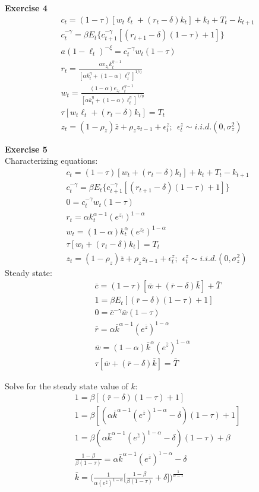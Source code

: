 \documentclass[letterpaper,12pt]{article}
\theoremstyle{definition}
\begin{document}
\textbf{Exercise 4}
\begin{align*}
  &c_t = (1-\tau) [w_t\ell_t+(r_t-\delta)k_t]+k_t+T_t-k_{t+1}
  \\
  &c_t^{-\gamma} = \beta E_t\{c_{t+1}^{-\gamma}[(r_{t+1}-\delta)(1-\tau)+1]\}
  \\
  &a(1-\ell_t)^{-\xi} = c_t^{-\gamma}w_t(1-\tau)
  \\
  &r_t = \frac{\alpha e_{z_t} k_t^{\eta-1}}{[\alpha k_t^\eta+(1-\alpha)\ell_t^\eta]^{1/\eta}}
  \\
  &w_t = \frac{(1-\alpha) e_{z_t} \ell_t^{\eta-1}}{[\alpha k_t^\eta+(1-\alpha)\ell_t^\eta]^{1/\eta}}
  \\
  &\tau[w_t\ell_t+(r_t-\delta)k_t] = T_t
  \\
  &z_t = (1-\rho_z)\bar{z}+\rho_zz_{t-1}+\epsilon_t^z; \ \ \epsilon_t^z \sim i.i.d.(0, \sigma_z^2)
\end{align*}

\textbf{Exercise 5} \\
Characterizing equations:
\begin{align*}
  &c_t = (1-\tau) [w_t+(r_t-\delta)k_t]+k_t+T_t-k_{t+1}
  \\
  &c_t^{-\gamma} = \beta E_t\{c_{t+1}^{-\gamma}[(r_{t+1}-\delta)(1-\tau)+1]\}
  \\
  &0 = c_t^{-\gamma}w_t(1-\tau)
  \\
  &r_t = \alpha k_t^{\alpha-1} (e^{z_t})^{1-\alpha}
  \\
  &w_t = (1-\alpha)k_t^{\alpha}(e^{z_t})^{1-\alpha}
  \\
  &\tau[w_t+(r_t-\delta)k_t] = T_t
  \\
  &z_t = (1-\rho_z)\bar{z}+\rho_zz_{t-1}+\epsilon_t^z; \ \ \epsilon_t^z \sim i.i.d.(0, \sigma_z^2)
\end{align*}
Steady state:
\begin{align*}
  &\bar{c} = (1-\tau) [\bar{w}+(\bar{r}-\delta)\bar{k}]+\bar{T}
  \\
  &1 = \beta E_t[(\bar{r}-\delta)(1-\tau)+1]
  \\
  &0 = \bar{c}^{-\gamma}\bar{w}(1-\tau)
  \\
  &\bar{r} = \alpha \bar{k}^{\alpha-1} (e^{\bar{z}})^{1-\alpha}
  \\
  &\bar{w} = (1-\alpha)\bar{k}^{\alpha}(e^{\bar{z}})^{1-\alpha}
  \\
  &\tau[\bar{w}+(\bar{r}-\delta)\bar{k}] = \bar{T}
\end{align*}

Solve for the steady state value of $k$:
\begin{align*}
  &1 = \beta[(\bar{r}-\delta)(1-\tau)+1]
  \\
  &1 = \beta[(\alpha \bar{k}^{\alpha-1}(e^{\bar{z}})^{1-\alpha}-\delta)(1-\tau)+1]
  \\
  &1 = \beta(\alpha \bar{k}^{\alpha-1}(e^{\bar{z}})^{1-\alpha}-\delta)(1-\tau)+\beta
  \\
  &\frac{1-\beta}{\beta(1-\tau)} = \alpha \bar{k}^{\alpha-1}(e^{\bar{z}})^{1-\alpha}-\delta
  \\
  &\bar{k} = \Big(\frac{1}{\alpha(e^{\bar{z}})^{1-\alpha}} \Big[\frac{1-\beta}{\beta(1-\tau)}+\delta \Big]\Big)^{\frac{1}{\alpha-1}}
\end{align*}
\end{document}

